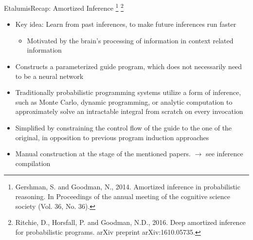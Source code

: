 \documentclass[AERbeamer%
              ,optEnglish%
              ,optBiber%
              ,optBibstyleAlphabetic%
              ,optBeamerClassicFormat%
              ]{AERlatex}%
\begin{document}
\begin{frame}[c]{Etalumis}{Recap: Amortized Inference \footnote{Gershman, S. and Goodman, N., 2014. Amortized inference in
                                                                probabilistic reasoning. In Proceedings of the annual meeting
                                                                of the cognitive science society (Vol. 36, No. 36).}
                                                      \footnote{Ritchie, D., Horsfall, P. and Goodman, N.D., 2016. Deep amortized
                                                                inference for probabilistic programs. arXiv preprint arXiv:1610.05735.}}
    \centering
    \begin{itemize}
        \item Key idea: Learn from past inferences, to make future inferences run faster
        \begin{itemize}
            \item Motivated by the brain's processing of information in context related information
        \end{itemize}
        \item Constructs a parameterized guide program, which does not necessarily need to be a neural network
        \item Traditionally probabilistic programming systems utilize a form of inference, such as Monte Carlo, dynamic programming, or
              analytic computation to approximately solve an intractable integral from scratch on every invocation
        \item Simplified by constraining the control flow of the guide to the one of the original, in opposition to previous
              program induction approaches
        \item Manual construction at the stage of the mentioned papers. $\rightarrow$ see inference compilation
    \end{itemize}
\end{frame}
\end{document}
